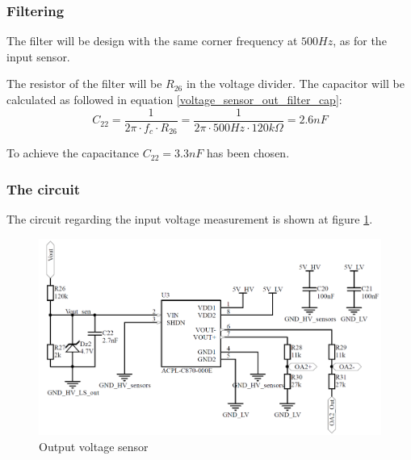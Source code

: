 \subsubsection{Filtering}
The filter will be design with the same corner frequency at $500Hz$, as for the input sensor.

The resistor of the filter will be $R_{26}$ in the voltage divider. The capacitor will be calculated as followed in equation \ref{voltage_sensor_out_filter_cap}:
\begin{equation} \label{voltage_sensor_out_filter_cap}
	C_{22} = \frac{1}{2\pi \cdot f_c \cdot R_{26}} = \frac{1}{2 \pi \cdot 500Hz \cdot 120k\Omega} = 2.6nF
\end{equation}

To achieve the capacitance $C_{22} = 3.3nF$ has been chosen. 

\subsubsection{The circuit}
The circuit regarding the input voltage measurement is shown at figure \ref{fig:output_voltage_sensor_circuit}. 

\begin{figure}[H]
	\begin{center}
		\includegraphics[width=0.7\linewidth]{../Pictures/P1/Sensors/output_voltage_sensor.PNG}
		\caption{Output voltage sensor}
		\label{fig:output_voltage_sensor_circuit}
	\end{center}
\end{figure}